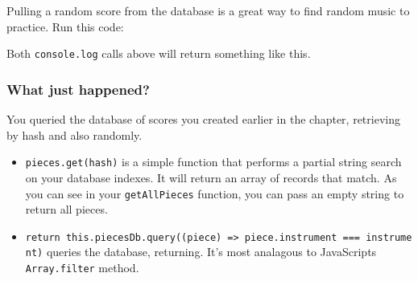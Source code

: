 Pulling a random score from the database is a great way to find random
music to practice. Run this code:

\begin{Shaded}
\begin{Highlighting}[]
\OperatorTok{=} \NormalTok{(}\NormalTok{)}
\OperatorTok{=}\NormalTok{ pieces[} \OperatorTok{*} \NormalTok{() }\OperatorTok{|} \NormalTok{]}
\end{Highlighting}
\end{Shaded}

Both \texttt{console.log} calls above will return something like this.

\begin{Shaded}
\begin{Highlighting}[]
\FunctionTok{\{}
  \FunctionTok{:}\FunctionTok{,}
  \FunctionTok{:}
\FunctionTok{\}}
\end{Highlighting}
\end{Shaded}

\subsubsection{What just happened?}\label{what-just-happened-7}

You queried the database of scores you created earlier in the chapter,
retrieving by hash and also randomly.

\begin{itemize}
\tightlist
\item
  \texttt{pieces.get(hash)} is a simple function that performs a partial
  string search on your database indexes. It will return an array of
  records that match. As you can see in your \texttt{getAllPieces}
  function, you can pass an empty string to return all pieces.
\item
  \texttt{return\ this.piecesDb.query((piece)\ =\textgreater{}\ piece.instrument\ ===\ instrument)}
  queries the database, returning. It's most analagous to JavaScripts
  \texttt{Array.filter} method.
\end{itemize}

